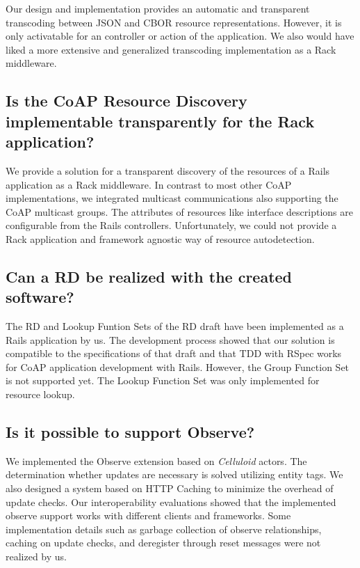 		Our design and implementation provides an automatic and transparent
		transcoding between \ac{JSON} and \ac{CBOR} resource representations.
		However, it is only activatable for an controller or action of the
		application. We also would have liked a more extensive and generalized
		transcoding implementation as a Rack middleware.

	\subsection*{Is the \ac{CoAP} Resource Discovery implementable
		transparently for the Rack application?}

		We provide a solution for a transparent discovery of the resources of a
		\ac{Rails} application as a Rack middleware. In contrast to most other
		\ac{CoAP} implementations, we integrated multicast communications also
		supporting the \ac{CoAP} multicast groups. The attributes of resources
		like interface descriptions are configurable from the \ac{Rails}
		controllers. Unfortunately, we could not provide a Rack application and
		framework agnostic way of resource autodetection.

	\subsection*{Can a \acl{RD} be realized with the created software?}

		The \ac{RD} and Lookup Funtion Sets of the \ac{RD} draft \cite{rd} have
		been implemented as a \ac{Rails} application by us. The development
		process showed that our solution is compatible to the specifications of
		that draft and that \ac{TDD} with RSpec works for \ac{CoAP} application
		development with \ac{Rails}. However, the Group Function Set is not
		supported yet. The Lookup Function Set was only implemented for
		resource lookup.

	\subsection*{Is it possible to support Observe?}

		We implemented the Observe extension based on \emph{Celluloid} actors.
		The determination whether updates are necessary is solved utilizing
		entity tags. We also designed a system based on \ac{HTTP} Caching to
		minimize the overhead of update checks. Our interoperability
		evaluations showed that the implemented observe support works with
		different clients and frameworks. Some implementation details such as
		garbage collection of observe relationships, caching on update checks,
		and deregister through reset messages were not realized by us.

